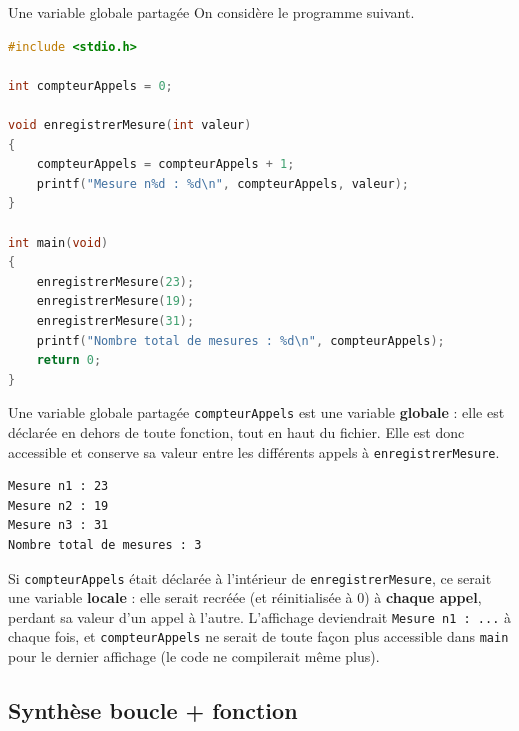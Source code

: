 \begin{UPSTIexercice}{Une variable globale partagée}
    On considère le programme suivant.
    \begin{lstlisting}[language=C]
#include <stdio.h>

int compteurAppels = 0;

void enregistrerMesure(int valeur)
{
    compteurAppels = compteurAppels + 1;
    printf("Mesure n%d : %d\n", compteurAppels, valeur);
}

int main(void)
{
    enregistrerMesure(23);
    enregistrerMesure(19);
    enregistrerMesure(31);
    printf("Nombre total de mesures : %d\n", compteurAppels);
    return 0;
}
    \end{lstlisting}
\end{UPSTIexercice}

\begin{UPSTIprofOnlyEnv}
    \begin{UPSTIcorrectionP}{Une variable globale partagée}
        \texttt{compteurAppels} est une variable \textbf{globale} : elle est déclarée en dehors de toute fonction, tout en haut du fichier. Elle est donc accessible et conserve sa valeur entre les différents appels à \texttt{enregistrerMesure}.
        \begin{lstlisting}[language=bash,style=console]
Mesure n1 : 23
Mesure n2 : 19
Mesure n3 : 31
Nombre total de mesures : 3
        \end{lstlisting}
        Si \texttt{compteurAppels} était déclarée à l'intérieur de \texttt{enregistrerMesure}, ce serait une variable \textbf{locale} : elle serait recréée (et réinitialisée à 0) à \textbf{chaque appel}, perdant sa valeur d'un appel à l'autre. L'affichage deviendrait \texttt{Mesure n1 : ...} à chaque fois, et \texttt{compteurAppels} ne serait de toute façon plus accessible dans \texttt{main} pour le dernier affichage (le code ne compilerait même plus).
    \end{UPSTIcorrectionP}
\end{UPSTIprofOnlyEnv}


\subsection{Synthèse boucle + fonction}

